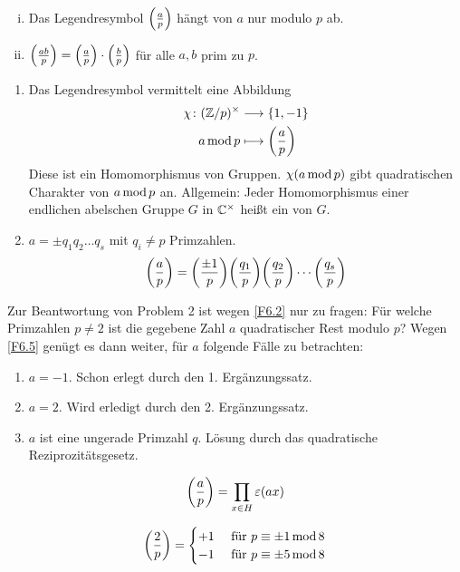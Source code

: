 \begin{falko} \label{F6.5}
	\begin{enumerate}[(i)]
		\item Das Legendresymbol $\left(\frac{a}{p}\right)$ hängt von $a$ nur modulo $p$ ab.
		\item $\left(\frac{ab}{p}\right) = \left(\frac{a}{p}\right) \cdot \left(\frac{b}{p}\right)$ für alle $a,b$ prim zu $p$.
	\end{enumerate}
\end{falko}

	\begin{enumerate}[1)]
		\item Das Legendresymbol vermittelt eine Abbildung
		\begin{equation}
		\begin{aligned}
			\chi\colon (\mathbb{Z}/p)^\times &\longrightarrow \{1, -1\} \\
			a \operatorname{mod} p &\longmapsto \left(\frac{a}{p}\right)
		\end{aligned}
		\end{equation}
		Diese ist ein Homomorphismus von Gruppen. $\chi(a \operatorname{mod} p)$ gibt quadratischen Charakter von $a \operatorname{mod} p$ an. Allgemein: Jeder Homomorphismus einer endlichen abelschen Gruppe $G$ in $\mathbb{C}^\times$ heißt ein  von $G$.
		\item $a = \pm q_1 q_2 \dots q_s$ mit $q_i \neq p$ Primzahlen.
		\[ \leg{a}{p} = \leg{\pm 1}{p} \leg{q_1}{p} \leg{q_2}{p} \cdots \leg{q_s}{p} \]
	\end{enumerate}
	
Zur Beantwortung von Problem 2 ist wegen \ref{F6.2} nur zu fragen: Für welche Primzahlen $p \neq 2$ ist die gegebene Zahl $a$ quadratischer Rest modulo $p$? Wegen \ref{F6.5} genügt es dann weiter, für $a$ folgende Fälle zu betrachten: \begin{enumerate}[1.]
	\item $a = -1$. Schon erlegt durch den 1. Ergänzungssatz.
	\item $a = 2$. Wird erledigt durch den 2. Ergänzungssatz. 
	\item $a$ ist eine ungerade Primzahl $q$. Lösung durch das quadratische Reziprozitätsgesetz. 
\end{enumerate}

\begin{falko} \label{F6.6}
	\[ \left(\frac{a}{p}\right) = \prod_{x \in H} \varepsilon(ax) \]
\end{falko}

\begin{falko}[2. Ergänzungssatz] \label{F6.7}
	\[ \left(\frac{2}{p}\right) = \begin{cases}
		+1 & \text{ für } p \equiv \pm 1 \operatorname{mod} 8 \\
		-1 & \text{ für } p \equiv \pm 5 \operatorname{mod} 8
	\end{cases} \] 
\end{falko}

